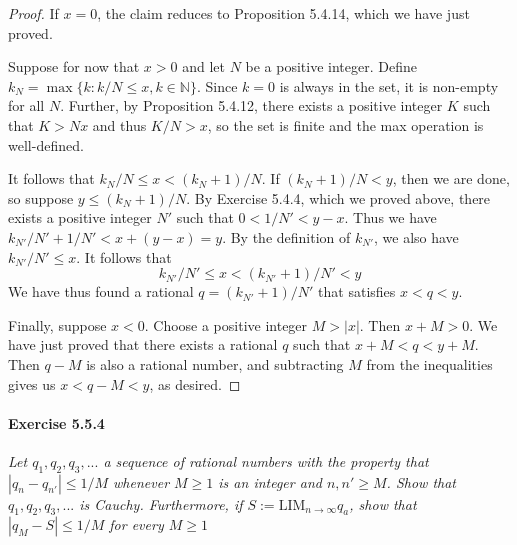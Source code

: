 \documentclass{article}
\newcommand{\ra}{\rightarrow}
\newcommand{\LIM}{{\mathrm{LIM}}}
\begin{document}
\begin{proof}
If $x = 0$, the claim reduces to Proposition 5.4.14, which we have just proved. 

Suppose for now that $x > 0$ and let $N$ be a positive integer. Define $k_N = \max \{ k : k/N \leq x, k \in \mathbb{N} \}.$ Since $k = 0$ is always in  the set, it is non-empty for all $N$. Further, by Proposition 5.4.12, there exists a positive integer $K$ such that $K > Nx$ and thus $K/N > x$, so the set is finite and the max operation is well-defined. 

It follows that $k_N/N \leq x < (k_N+1)/N$. If $(k_N+1)/N < y$, then we are done, so suppose $y \leq (k_N+1)/N$. By Exercise 5.4.4, which we proved above, there exists a positive integer $N'$ such that $0 < 1/N' < y - x$. Thus we have $k_{N'}/N' + 1/N' < x + (y-x) = y$. By the definition of $k_{N'}$, we also have $k_{N'}/N' \leq x$. It follows that 
\[ k_{N'}/N' \leq x < (k_{N'}+1)/N' < y \]
We have thus found a rational $q = (k_{N'}+1)/N'$ that satisfies $x < q < y$.

Finally, suppose $x < 0$. Choose a positive integer $M > |x|$. Then $x + M > 0$. We have just proved that there exists a rational $q$ such that $x + M < q < y + M$. Then $q - M$ is also a rational number, and subtracting $M$ from the inequalities gives us $x < q - M < y$, as desired.
\end{proof}

\paragraph{Exercise 5.5.4}
\textit{Let $q_1, q_2, q_3,...$ a sequence of rational numbers with the property that $|q_n - q_{n'}| \leq 1/M$ whenever $M\geq 1$ is an integer and $n,n' \geq M$. Show that  $q_1, q_2, q_3,...$ is Cauchy. Furthermore, if $S := \LIM_{n \ra \infty} q_a$, show that $|q_M - S | \leq 1/M$ for every $M \geq 1$}
\end{document}
